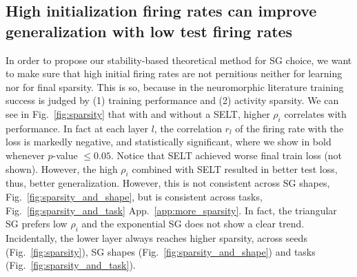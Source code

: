 \subsection{High  initialization firing rates can improve generalization with low test firing rates}
\label{sec:ressparse}


In order to propose our stability-based theoretical method for SG choice, we want to make sure that high initial firing rates are not pernitious neither for learning nor for final sparsity. This is so, because in the neuromorphic literature training success is judged by (1) training performance and (2) activity sparsity. 
We can see in Fig.~\ref{fig:sparsity} that with and without a SELT, higher $\rho_i$ correlates with performance. 
In fact at each layer $l$, the correlation $r_l$ of the firing rate with the loss is markedly negative, and statistically significant, where we show in bold whenever $p$-value $\leq0.05$.
Notice that SELT achieved worse final train loss (not shown). However, the high $\rho_i$ combined with SELT resulted in better test loss, thus, better generalization. However, this is not consistent across SG shapes, Fig.~\ref{fig:sparsity_and_shape}, but is consistent across tasks, Fig.~\ref{fig:sparsity_and_task} App.~\ref{app:more_sparsity}. In fact, the triangular SG prefers low $\rho_i$ and the exponential SG does not show a clear trend. Incidentally, the lower layer always reaches higher sparsity, across seeds (Fig.~\ref{fig:sparsity}), SG shapes (Fig.~\ref{fig:sparsity_and_shape}) and tasks (Fig.~\ref{fig:sparsity_and_task}).

